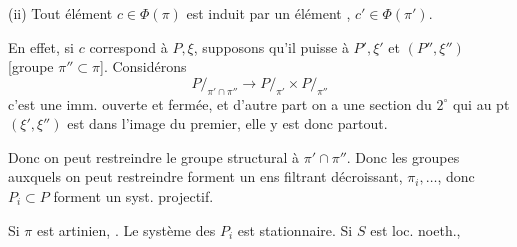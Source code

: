 
(ii) Tout élément $c\in\Phi(\pi)$ est induit par un élément , $c'\in\Phi(\pi')$.


En effet, si $c$ correspond à $P,\xi$, supposons  qu'il puisse   à $P',\xi'$  et $(P'',\xi'')$ [groupe $\pi''\subset\pi$].
Considérons
\[
P/_{\pi'\cap\pi''}\longrightarrow P/_{\pi'}\times P/_{\pi''}
\]
c'est une imm. ouverte et fermée, et d'autre part on a une section du $2^\circ$  qui  au pt $(\xi',\xi'')$ est dans l'image du premier, elle y est donc partout.

Donc on peut restreindre le groupe structural à $\pi'\cap\pi''$. Donc les groupes auxquels on peut restreindre forment un ens filtrant décroissant, $\pi_i,\ldots$, donc $P_i\subset P$ forment un syst. projectif.

Si  $\pi$ est artinien, . Le système des $P_i$ est  stationnaire. Si $S$ est loc. noeth.,  
